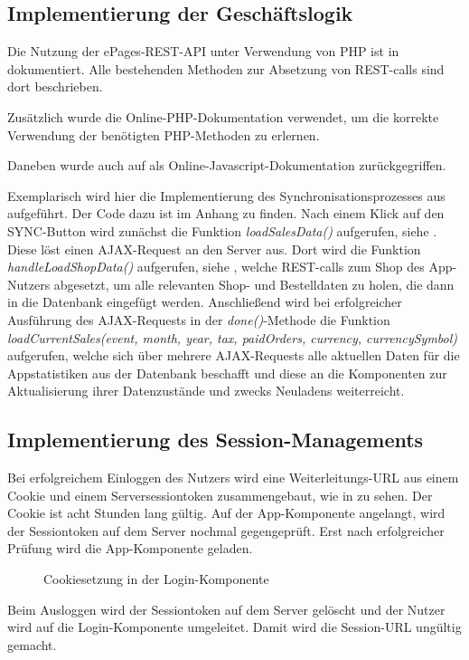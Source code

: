 \subsection{Implementierung der Geschäftslogik}
\label{sec:ImplementierungGeschaeftslogik}

Die Nutzung der ePages-REST-API unter Verwendung von PHP ist in \cite{epagesphp} dokumentiert. Alle bestehenden Methoden zur Absetzung von REST-calls sind dort beschrieben.

Zusätzlich wurde die Online-PHP-Dokumentation \cite{phpdoc} verwendet, um die korrekte Verwendung der benötigten PHP-Methoden zu erlernen.

Daneben wurde auch auf \cite{javascript} als Online-Javascript-Dokumentation zurückgegriffen.
  
Exemplarisch wird hier die Implementierung des Synchronisationsprozesses aus  aufgeführt. Der Code dazu ist im Anhang zu finden. Nach einem Klick auf den SYNC-Button wird zunächst die Funktion \textit{loadSalesData()} aufgerufen, siehe . Diese löst einen AJAX-Request an den Server aus. Dort wird die Funktion \textit{handleLoadShopData()} aufgerufen, siehe , welche REST-calls zum Shop des App-Nutzers abgesetzt, um alle relevanten Shop- und Bestelldaten zu holen, die dann in die Datenbank eingefügt werden.
Anschließend wird bei erfolgreicher Ausführung des AJAX-Requests in der \textit{done()}-Methode die Funktion \textit{loadCurrentSales(event, month, year, tax, paidOrders, currency, currencySymbol)} aufgerufen, welche sich über mehrere AJAX-Requests alle aktuellen Daten für die Appstatistiken aus der Datenbank beschafft und diese an die Komponenten zur Aktualisierung ihrer Datenzustände und zwecks Neuladens weiterreicht.  

\subsection{Implementierung des Session-Managements}
\label{sec:Session}

Bei erfolgreichem Einloggen des Nutzers wird eine Weiterleitungs-URL aus einem Cookie und einem Serversessiontoken zusammengebaut, wie in  zu sehen. Der Cookie ist acht Stunden lang gültig. Auf der App-Komponente angelangt, wird der Sessiontoken auf dem Server nochmal gegengeprüft. Erst nach erfolgreicher Prüfung wird die App-Komponente geladen. 
\begin{figure}[htb]
\centering
{}
\caption{Cookiesetzung in der Login-Komponente}
\label{fig:cookie}
\end{figure}
Beim Ausloggen wird der Sessiontoken auf dem Server gelöscht und der Nutzer wird auf die Login-Komponente umgeleitet. Damit wird die Session-URL ungültig gemacht.